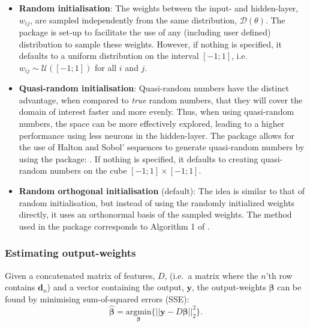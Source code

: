 \documentclass[
]{jss}
\providecommand{\tightlist}{%
  \setlength{\itemsep}{0pt}\setlength{\parskip}{0pt}}
\begin{document}
\begin{itemize}
\tightlist
\item
  \textbf{Random initialisation}: The weights between the input- and
  hidden-layer, \(w_{ij}\), are sampled independently from the same
  distribution, \(\mathcal D(\theta)\). The  package is set-up
  to facilitate the use of any (including user defined) distribution to
  sample these weights. However, if nothing is specified, it defaults to
  a uniform distribution on the interval \([-1;1]\),
  i.e.~\(w_{ij}\sim\mathcal U([-1;1])\) for all \(i\) and \(j\).
\item
  \textbf{Quasi-random initialisation}: Quasi-random numbers have the
  distinct advantage, when compared to \emph{true} random numbers, that
  they will cover the domain of interest faster and more evenly. Thus,
  when using quasi-random numbers, the space can be more effectively
  explored, leading to a higher performance using less neurons in the
  hidden-layer. The  package allows for the use of Halton and
  Sobol' sequences to generate quasi-random numbers by using the
   package:  \citep{randtoolbox}. If
  nothing is specified, it defaults to creating quasi-random numbers on
  the cube \([-1;1] \times [-1;1]\).
\item
  \textbf{Random orthogonal initialisation} (default): The idea is
  similar to that of random initialisation, but instead of using the
  randomly initialized weights directly, it uses an orthonormal basis of
  the sampled weights. The method used in the  package
  corresponds to Algorithm 1 of \citep{Wang2017}.
\end{itemize}

\hypertarget{EST}{%
\subsubsection{Estimating output-weights}\label{EST}}

Given a concatenated matrix of features, \(D\), (i.e.~a matrix where the
\(n\)'th row contains \(\boldsymbol d_n\)) and a vector containing the
output, \(\boldsymbol y\), the output-weights \(\boldsymbol \beta\) can
be found by minimising sum-of-squared errors (SSE): \begin{equation}
    \hat{\boldsymbol{\beta}} = \underset{\boldsymbol{\beta}}{\text{argmin}} \Big\{ || \boldsymbol{y} - D\boldsymbol{\beta}||_2^2\Big\}. \label{eq:ssq}
\end{equation}
\end{document}
